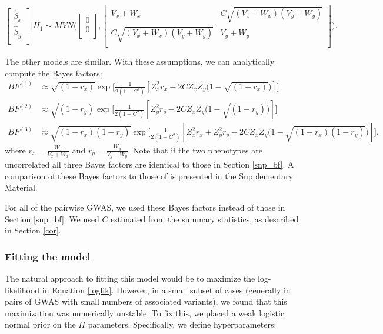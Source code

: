 \documentclass[11pt,titlepage]{article}
\begin{document}
\begin{equation}
    \begin{bmatrix}
    \hat \beta_x        \\[0.3em]
      \hat \beta_y     \\[0.3em]
     \end{bmatrix} | H_1
     \sim 
     MVN \bigg( 
          \begin{bmatrix}
     0       \\[0.3em]
     0     \\[0.3em]
     \end{bmatrix}
     , 
        \begin{bmatrix}
     V_x+W_x  & C\sqrt{ (V_x+W_x)(V_y+W_y)}  \\[0.3em]
       C\sqrt{ (V_x+W_x)(V_y+W_y)}  & V_y+W_y    \\[0.3em]
     \end{bmatrix}
 \bigg).
\end{equation}

The other models are similar. With these assumptions, we can analytically compute the Bayes factors:
\begin{align}
BF^{(1)} &\approx \sqrt{(1-r_x)} \exp \bigg[\frac{1}{2(1-C^2)} [ Z_x^2 r_x - 2C Z_x Z_y \big(1-\sqrt{ (1-r_x)} \big)] \bigg] \\
BF^{(2)} &\approx \sqrt{(1-r_y)} \exp \bigg[\frac{1}{2(1-C^2)} [ Z_y^2 r_y - 2C Z_x Z_y \big(1-\sqrt{ (1-r_y)} \big)] \bigg] \\
BF^{(3)} &\approx \sqrt{(1-r_x)(1-r_y)} \exp \bigg[\frac{1}{2(1-C^2)} [ Z_x^2 r_x +Z_y^2 r_y- 2C Z_x Z_y \big(1-\sqrt{ (1-r_x)(1-r_y)} \big)] \bigg],
\end{align}
\noindent where $r_x = \frac{W_x}{V_x+W_x}$ and $r_y = \frac{W_y}{V_y+W_y}$. Note that if the two phenotypes are uncorrelated all three Bayes factors are identical to those in Section \ref{snp_bf}. A comparison of these Bayes factors to those of \citet{Stephens:2013fk} is presented in the Supplementary Material.

For all of the pairwise GWAS, we used these Bayes factors instead of those in Section \ref{snp_bf}. We used $C$ estimated from the summary statistics, as described in Section \ref{cor}. 

\subsubsection{Fitting the model}\label{map}
The natural approach to fitting this model would be to maximize the log-likelihood in Equation \ref{loglik}. However, in a small subset of cases (generally in pairs of GWAS with small numbers of associated variants), we found that this maximization was numerically unstable. To fix this, we placed a weak logistic normal prior on the $\Pi$ parameters. Specifically, we define hyperparameters:
\end{document}
